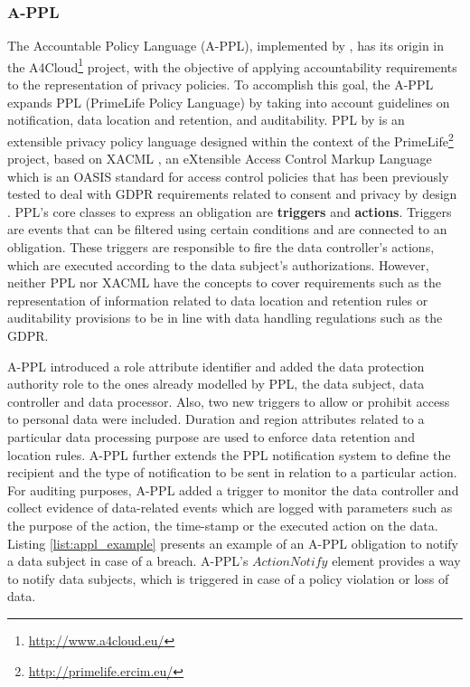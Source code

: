 \subsubsection{A-PPL}
\label{sec:appl}
The Accountable Policy Language (A-PPL), implemented by \cite{azraoui_appl_2014}, has its origin in the A4Cloud\footnote{\url{http://www.a4cloud.eu/}} project, with the objective of applying accountability requirements to the representation of privacy policies.
To accomplish this goal, the A-PPL expands PPL (PrimeLife Policy Language) by taking into account guidelines on notification, data location and retention, and auditability.
PPL by \cite{ardagna_primelife_2009} is an extensible privacy policy language designed within the context of the PrimeLife\footnote{\url{http://primelife.ercim.eu/}} project, based on XACML \citep{parducci_extensible_2013}, an eXtensible Access Control Markup Language which is an OASIS standard for access control policies that has been previously tested to deal with GDPR requirements related to consent \citep{fatema_compliance_2017} and privacy by design \citep{piras_defend_2019}. %
PPL's core classes to express an obligation are \textbf{triggers} and \textbf{actions}.
Triggers are events that can be filtered using certain conditions and are connected to an obligation.
These triggers are responsible to fire the data controller's actions, which are executed according to the data subject's authorizations.
However, neither PPL nor XACML have the concepts to cover requirements such as the representation of information related to data location and retention rules or auditability provisions to be in line with data handling regulations such as the GDPR.%

A-PPL introduced a role attribute identifier and added the data protection authority role to the ones already modelled by PPL, the data subject, data controller and data processor.
Also, two new triggers to allow or prohibit access to personal data were included.
Duration and region attributes related to a particular data processing purpose are used to enforce data retention and location rules.
A-PPL further extends the PPL notification system to define the recipient and the type of notification to be sent in relation to a particular action.
For auditing purposes, A-PPL added a trigger to monitor the data controller and collect evidence of data-related events which are logged with parameters such as the purpose of the action, the time-stamp or the executed action on the data.
Listing \ref{list:appl_example} presents an example of an A-PPL obligation to notify a data subject in case of a breach. A-PPL's $ActionNotify$ element provides a way to notify data subjects, which is triggered in case of a policy violation or loss of data.

